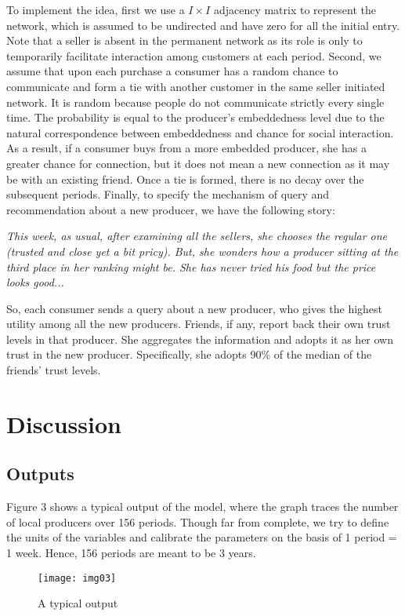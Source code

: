 \documentclass[11pt, oneside]{article}
\begin{document}
To implement the idea, first we use a $I \times I$ adjacency matrix \parencite{Jackson2008} to represent the network, which is assumed to be undirected and have zero for all the initial entry. Note that a seller is absent in the permanent network as its role is only to temporarily facilitate interaction among customers at each period. Second, we assume that upon each purchase a consumer has a random chance to communicate and form a tie with another customer in the same seller initiated network. It is random because people do not communicate strictly every single time. The probability is equal to the producer's embeddedness level due to the natural correspondence between embeddedness and chance for social interaction. As a result, if a consumer buys from a more embedded producer, she has a greater chance for connection, but it does not mean a new connection as it may be with an existing friend. Once a tie is formed, there is no decay over the subsequent periods. Finally, to specify the mechanism of query and recommendation about a new producer, we have the following story:
\begin{adjustwidth}{1cm}{}
\textit{This week, as usual, after examining all the sellers, she chooses the regular one (trusted and close yet a bit pricy). But, she wonders how a producer sitting at the third place in her ranking might be. She has never tried his food but the price looks good...}
\end{adjustwidth}
So, each consumer sends a query about a new producer, who gives the highest utility among all the new producers. Friends, if any, report back their own trust levels in that producer. She aggregates the information and adopts it as her own trust in the new producer. Specifically, she adopts 90\% of the median of the friends' trust levels.

\section{Discussion}
\subsection{Outputs}
Figure 3 shows a typical output of the model, where the graph traces the number of local producers over 156 periods. Though far from complete, we try to define the units of the variables and calibrate the parameters on the basis of 1 period = 1 week. Hence, 156 periods are meant to be 3 years.
\begin{figure}[h]
\centering
  \texttt{[image: img03]}
  \caption{A typical output}
\end{figure}
\end{document}
